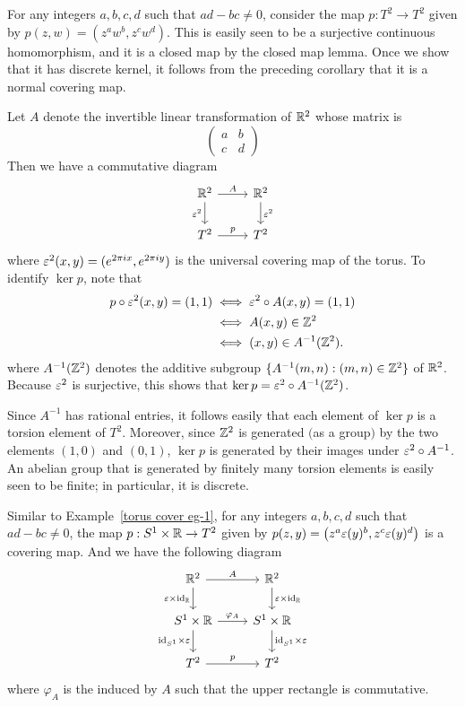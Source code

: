 \begin{example}\label{torus cover eg-1}
For any integers $a,b,c,d$ such that $ad-bc\neq0$, consider the map $p:T^2\to T^2$ given by $p(z,w)=(z^aw^b,z^cw^d)$. This is easily seen to be a surjective continuous homomorphism, and it is a closed map by
the closed map lemma. Once we show that it has discrete kernel, it follows from the preceding corollary that it is a normal covering map.\par
Let $A$ denote the invertible linear transformation of $\mathbb{R}^2$ whose matrix is 
\[\begin{pmatrix}a&b\\c&d\end{pmatrix}\]
Then we have a commutative diagram
\[\begin{tikzcd}
\R^2\ar[d,swap,"\eps^2"]\ar[r,"A"]&\R^2\ar[d,"\eps^2"]\\
T^2\ar[r,"p"]&T^2
\end{tikzcd}\]
where $\varepsilon^2(x,y)=(e^{2\pi ix},e^{2\pi iy})$ is the universal covering map of the torus. To identify $\ker p$, note that
\begin{align*}
p\circ\varepsilon^2(x,y)=(1,1)&\iff\varepsilon^2\circ A(x,y)=(1,1)\\
&\iff A(x,y)\in\mathbb{Z}^2\\
&\iff (x,y)\in A^{-1}(\mathbb{Z}^2).
\end{align*}
where $A^{-1}(\mathbb{Z}^2)$ denotes the additive subgroup $\{A^{-1}(m,n):(m,n)\in\mathbb{Z}^2\}$ of $\mathbb{R}^2$. Because $\varepsilon^2$ is surjective, this shows that $\mathrm{ker}\, p=\varepsilon^2\circ A^{-1}(\mathbb{Z}^2)$.\par
Since $A^{-1}$ has rational entries, it follows easily that each element of $\ker p$ is a torsion element of $T^2$. Moreover, since $\mathbb{Z}^2$ is generated $($as a group$)$ by the two elements $(1,0)$ and $(0,1)$, $\ker p$ is generated by their images under $\varepsilon^2\circ A^{-1}$. An abelian group that is generated by finitely many torsion elements is easily seen to be finite; in particular, it is discrete.
\end{example}
\begin{example}\label{torus cover eg-2}
Similar to Example~\ref{torus cover eg-1}, for any integers $a,b,c,d$ such that $ad-bc\neq0$, the map $p:S^1\times\mathbb{R}\to T^2$ given by $p(z,y)=\big(z^a\varepsilon(y)^b,z^c\varepsilon(y)^d\big)$ is a covering map. And we have the following diagram
\[\begin{tikzcd}
\R^2\ar[d,swap,"\eps\times\id_{\R}"]\ar[r,"A"]&\R^2\ar[d,"\eps\times\id_{\R}"]\\
S^1\times\R\ar[d,swap,"\id_{S^1}\times\eps"]\ar[r,"\varphi_A"]&S^1\times\R\ar[d,"\id_{S^1}\times\eps"]\\
T^2\ar[r,"p"]&T^2
\end{tikzcd}\]
where $\varphi_A$ is the induced by $A$ such that the upper rectangle is commutative.
\end{example}
